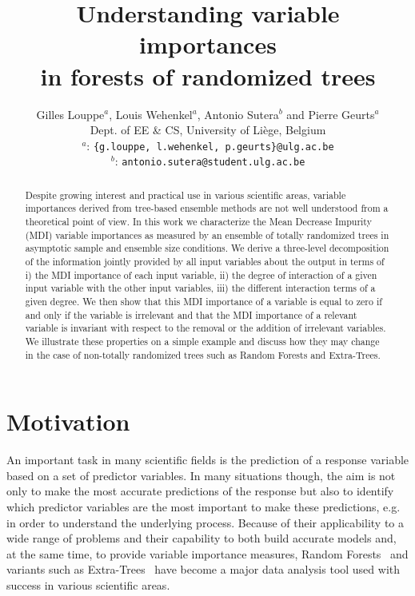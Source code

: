 \documentclass{article}
\title{\textbf{Understanding variable importances\\
in forests of randomized trees}}
\author{
Gilles Louppe$^{a}$, Louis Wehenkel$^{a}$, Antonio Sutera$^{b}$ and Pierre Geurts$^{a}$ \\
Dept. of EE \& CS, University of Liège, Belgium \\
$^{a}$: \texttt{\{g.louppe, l.wehenkel, p.geurts\}@ulg.ac.be}\\
$^{b}$: \texttt{antonio.sutera@student.ulg.ac.be}\\
}
\begin{document}
\maketitle
\allowdisplaybreaks

\begin{abstract}

Despite growing interest and practical use in various scientific areas, variable
importances derived from tree-based ensemble methods are not well understood
from a theoretical point of view. In this work we characterize the Mean Decrease
Impurity (MDI) variable importances as measured by an ensemble of totally
randomized trees in asymptotic sample and ensemble size conditions. We derive a
three-level decomposition of the  information jointly provided by all input
variables about the output in terms of i) the MDI importance of each input
variable, ii) the degree of interaction of a given input variable with the other
input variables, iii) the different interaction terms of a given degree. We then
show that this MDI importance of a variable is equal to zero if and only if the
variable is irrelevant and that the MDI importance of a relevant variable is
invariant with respect to the removal or the addition of irrelevant variables.
We illustrate these properties on a simple example and discuss how they may
change in the case of  non-totally randomized trees such as Random Forests and
Extra-Trees.


\end{abstract}




\section{Motivation}

An important task in many scientific fields is the prediction of  a response
variable based on a set of predictor variables. In many situations though, the
aim is not only to make the most accurate predictions of the response but also
to identify which predictor variables are the most important to make these
predictions, e.g. in order to understand the underlying process. Because of
their applicability to a wide range of problems and their capability to both
build accurate models and, at the same time, to provide variable importance
measures, Random Forests~\citep{breiman2001rf} and variants such as Extra-Trees~\citep{geurts2006et}
have become a major data analysis tool used with
success in various scientific areas.
\end{document}
